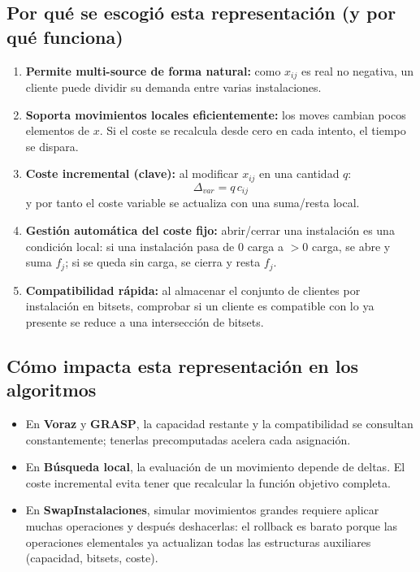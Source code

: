\documentclass[12pt, a4paper]{report}
\begin{document}
\subsection{Por qué se escogió esta representación (y por qué funciona)}

\begin{enumerate}
  \item \textbf{Permite multi-source de forma natural:} como $x_{ij}$ es real no negativa, un cliente puede dividir su demanda entre varias instalaciones.

  \item \textbf{Soporta movimientos locales eficientemente:} los moves cambian pocos elementos de $x$. Si el coste se recalcula desde cero en cada intento, el tiempo se dispara.

  \item \textbf{Coste incremental (clave):} al modificar $x_{ij}$ en una cantidad $q$:
  \[
    \Delta_{var} = q\,c_{ij}
  \]
  y por tanto el coste variable se actualiza con una suma/resta local.

  \item \textbf{Gestión automática del coste fijo:} abrir/cerrar una instalación es una condición local: si una instalación pasa de $0$ carga a $>0$ carga, se abre y suma $f_j$; si se queda sin carga, se cierra y resta $f_j$.

  \item \textbf{Compatibilidad rápida:} al almacenar el conjunto de clientes por instalación en bitsets, comprobar si un cliente es compatible con lo ya presente se reduce a una intersección de bitsets.
\end{enumerate}

\subsection{Cómo impacta esta representación en los algoritmos}

\begin{itemize}
  \item En \textbf{Voraz} y \textbf{GRASP}, la capacidad restante y la compatibilidad se consultan constantemente; tenerlas precomputadas acelera cada asignación.
  \item En \textbf{Búsqueda local}, la evaluación de un movimiento depende de deltas. El coste incremental evita tener que recalcular la función objetivo completa.
  \item En \textbf{SwapInstalaciones}, simular movimientos grandes requiere aplicar muchas operaciones y después deshacerlas: el rollback es barato porque las operaciones elementales ya actualizan todas las estructuras auxiliares (capacidad, bitsets, coste).
\end{itemize}
\end{document}
